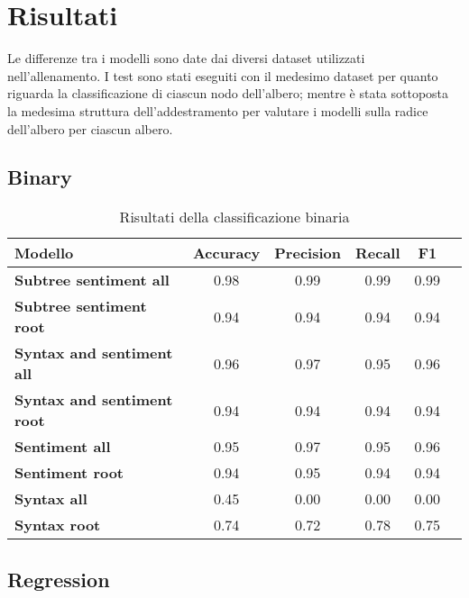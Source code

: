 \section{Risultati}

Le differenze tra i modelli sono date dai diversi dataset utilizzati
nell'allenamento. I test sono stati eseguiti con il medesimo dataset per quanto
riguarda la classificazione di ciascun nodo dell'albero; mentre è stata
sottoposta la medesima struttura dell'addestramento per valutare i modelli sulla
radice dell'albero per ciascun albero.

\subsection{Binary}

\begin{table}[H]
    \centering
    \begin{tabular}{|l|c|c|c|c|c|}
    \hline
    \textbf{Modello} & \textbf{Accuracy} & \textbf{Precision} & \textbf{Recall} & \textbf{F1} \\
    \hline
    \textbf{Subtree sentiment all} & 0.98 & 0.99 & 0.99 & 0.99 \\
    \textbf{Subtree sentiment root} & 0.94 & 0.94 & 0.94 & 0.94 \\
    \hline

    \textbf{Syntax and sentiment all} & 0.96 & 0.97 & 0.95 & 0.96 \\
    \textbf{Syntax and sentiment root} & 0.94 & 0.94 & 0.94 & 0.94 \\
    \hline

    \textbf{Sentiment all} & 0.95 & 0.97 & 0.95 & 0.96 \\
    \textbf{Sentiment root} & 0.94 & 0.95 & 0.94 & 0.94 \\
    \hline

    \textbf{Syntax all} & 0.45 & 0.00 & 0.00 & 0.00 \\
    \textbf{Syntax root} & 0.74 & 0.72 & 0.78 & 0.75 \\
    \hline
    \end{tabular}
    \caption{Risultati della classificazione binaria}
\end{table}

\subsection{Regression}


